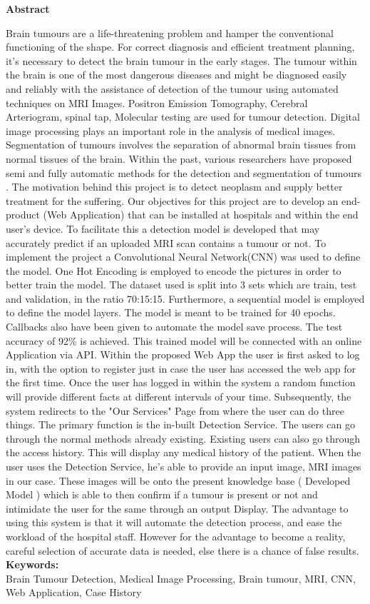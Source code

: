 \begin{center}
{\huge \bf Abstract}
\end{center}
\vspace{20mm}

Brain tumours are a life-threatening problem and hamper the conventional functioning of the shape. For correct diagnosis and efficient treatment planning, it's necessary to detect the brain tumour in the early stages. The tumour within the brain is one of the most dangerous diseases and might be diagnosed easily and reliably with the assistance of detection of the tumour using automated techniques on MRI Images. Positron Emission Tomography, Cerebral Arteriogram, spinal tap, Molecular testing are used for tumour detection. Digital image processing plays an important role in the analysis of medical images. Segmentation of tumours involves the separation of abnormal brain tissues from normal tissues of the brain. Within the past, various researchers have proposed semi and fully automatic methods for the detection and segmentation of tumours . The motivation behind this project is to detect neoplasm and supply better treatment for the suffering. Our objectives for this project are to develop an end-product (Web Application) that can be installed at hospitals and within the end user's device. To facilitate this a detection model is developed that may accurately predict if an uploaded MRI scan contains a tumour or not. To implement the project a Convolutional Neural Network(CNN) was used to define the model. One Hot Encoding is employed to encode the pictures in order to better train the model. The dataset used is split into 3 sets which are train, test and validation, in the ratio 70:15:15. Furthermore, a sequential model is employed to define the model layers. The model is meant to be trained for 40 epochs. Callbacks also have been given to automate the model save process. The test accuracy of 92\% is achieved. This trained model will be connected with an online Application via API. Within the proposed Web App the user is first asked to log in, with the option to register just in case the user has accessed the web app for the first time. Once the user has logged in within the system a random function will provide different facts at different intervals of your time. Subsequently, the system redirects to the "Our Services" Page from where the user can do three things. The primary function is the in-built Detection Service. The users can go through the normal methods already existing. Existing users can also go through the access history. This will display any medical history of the patient. When the user uses the Detection Service, he's able to provide an input image, MRI images in our case. These images will be onto the present knowledge base ( Developed Model ) which is able to then confirm if a tumour is present or not and intimidate the user for the same through an output Display. The advantage to using this system is that it will automate the detection process, and ease the workload of the hospital staff. However for the advantage to become a reality, careful selection of accurate data is needed, else there is a chance of false results.\\ 

{\bf{Keywords:}}\\ Brain Tumour Detection, Medical Image Processing, Brain tumour, MRI, CNN, Web Application, Case History 